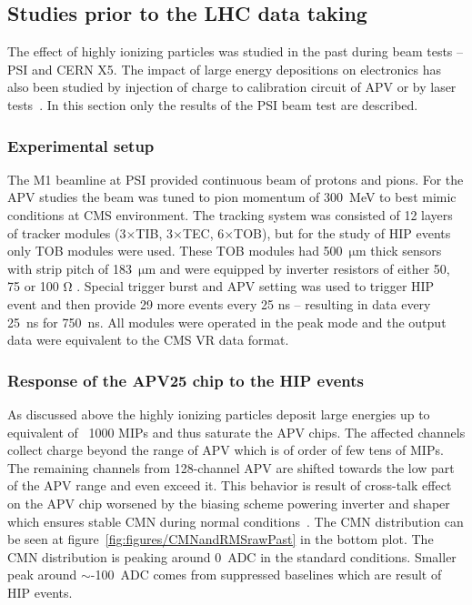 \subsection{Studies prior to the LHC data taking~\label{sec:HIPinPast}}

The effect of highly ionizing particles was studied in the past during beam tests -- PSI and CERN X5. The impact of large energy depositions on electronics has also been studied by injection of charge to calibration circuit of APV or by laser tests~\cite{Adam:2005pz}. In this section only the results of the PSI beam test are described.

\subsubsection{Experimental setup}

The M1 beamline at PSI provided continuous beam of protons and pions. For the APV studies the beam was tuned to pion momentum of 300~MeV to best mimic conditions at CMS environment. The tracking system was consisted of 12 layers of tracker modules (3$\times$TIB, 3$\times$TEC, 6$\times$TOB), but for the study of HIP events only TOB modules were used. These TOB modules had 500~$\mathrm{\mu m}$ thick sensors with strip pitch of 183~$\mathrm{\mu}$m and were equipped by inverter resistors of either 50, 75 or 100 $\mathrm{\Omega}$ . Special trigger burst and APV setting was used to trigger HIP event and then provide 29 more events every 25 ns -- resulting in data every 25~ns for 750~ns. All modules were operated in the peak mode and the output data were equivalent to the CMS VR data format. 




\subsubsection{Response of the APV25 chip to the HIP events}

As discussed above the highly ionizing particles deposit large energies up to equivalent of ~1000 MIPs and thus saturate the APV chips. The affected channels collect charge beyond the range of APV which is of order of few tens of MIPs. The remaining channels from 128-channel APV are shifted towards the low part of the APV range and even exceed it. This behavior is result of cross-talk effect on the APV chip worsened by the biasing scheme powering inverter and shaper which ensures stable CMN during normal conditions~\cite{Bainbridge:2004jc}. The CMN distribution can be seen at figure~\ref{fig:figures/CMNandRMSrawPast} in the bottom plot. The CMN distribution is peaking around 0~ADC in the standard conditions. Smaller peak around $\sim$-100~ADC comes from suppressed baselines which are result of HIP events. 

